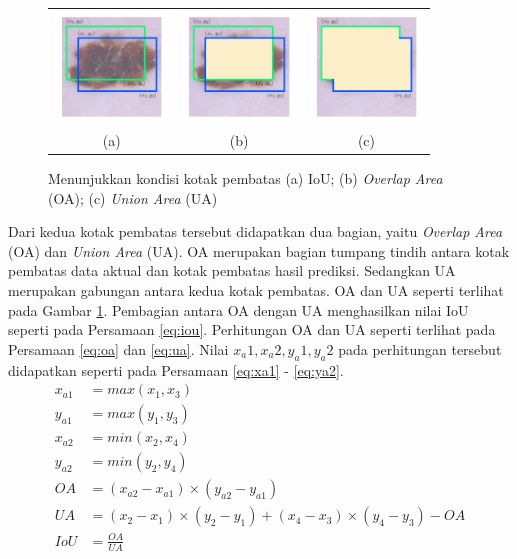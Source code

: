 \begin{figure}[H]
    \centering
    \begin{tabular}{ccc}
        \includegraphics[width=3cm]{img/bab2/bb-two.png}
        &
        \includegraphics[width=3cm]{img/bab2/bb-overlap.png}
        &
        \includegraphics[width=3cm]{img/bab2/bb-union.png}\\
        (a) &(b) &(c)\\
    \end{tabular}
    \caption{Menunjukkan kondisi kotak pembatas (a) IoU; (b) \textit{Overlap Area} (OA); (c) \textit{Union Area} (UA)}
    \label{fig:iou-cond}
\end{figure}

Dari kedua kotak pembatas tersebut didapatkan dua bagian, yaitu \textit{Overlap Area} (OA) dan \textit{Union Area} (UA). OA merupakan bagian tumpang tindih antara kotak pembatas data aktual dan kotak pembatas hasil prediksi. Sedangkan UA merupakan gabungan antara kedua kotak pembatas. OA dan UA seperti terlihat pada Gambar \ref{fig:iou-cond}. Pembagian antara OA dengan UA menghasilkan nilai IoU seperti pada Persamaan \ref{eq:iou}. Perhitungan OA dan UA seperti terlihat pada Persamaan \ref{eq:oa} dan \ref{eq:ua}. Nilai $x_a1, x_a2, y_a1, y_a2$ pada perhitungan tersebut didapatkan seperti pada Persamaan \ref{eq:xa1} - \ref{eq:ya2}.
\begin{align}
    \label{eq:xa1}
    x_{a1} &= max(x_1, x_3)\\
    \label{eq:ya1}
    y_{a1} &= max(y_1, y_3)\\
    \label{eq:xa2}
    x_{a2} &= min(x_2, x_4)\\
    \label{eq:ya2}
    y_{a2} &= min(y_2, y_4)\\
    \label{eq:oa}
    OA     &= (x_{a2}-x_{a1})\times (y_{a2}-y_{a1})\\
    \label{eq:ua}
    UA     &= (x_2-x_1)\times (y_2-y_1) + (x_4-x_3)\times (y_4-y_3) - OA\\
    \label{eq:iou}
    IoU    &= \frac{OA}{UA}
\end{align}

